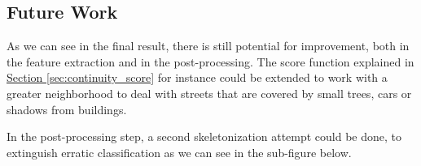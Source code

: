 \documentclass[10pt,conference,compsocconf]{IEEEtran}
\newcommand{\secref}[1]{\hyperref[#1]{Section \ref*{#1}}}
\begin{document}
\subsection{Future Work}
\label{sec:future_work}

As we can see in the final result, there is still potential for improvement, both in the feature extraction and in the post-processing. The score function explained in \secref{sec:continuity_score} for instance could be extended to work with a greater neighborhood to deal with streets that are covered by small trees, cars or shadows from buildings.

In the post-processing step, a second skeletonization attempt could be done, to extinguish erratic classification as we can see in the sub-figure  below.

\begin{figure}[bp!]
	\centering
	\hspace{0.025\linewidth}
	\hspace{0.025\linewidth}

\end{figure}
\end{document}
